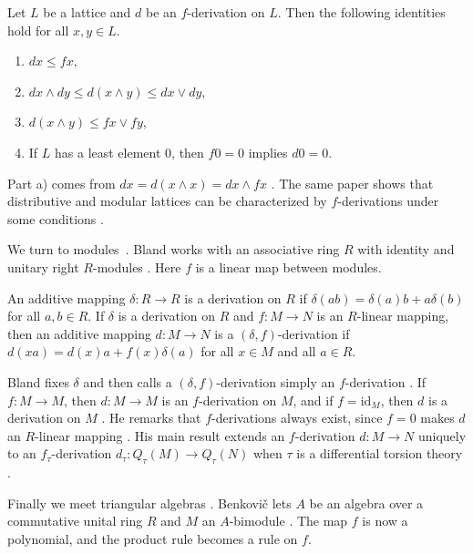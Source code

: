 \begin{proposition}\label{prop:f:lattice-first}
Let $L$ be a lattice and $d$ be an $f$-derivation on $L$. Then the following identities
hold for all $x,y\in L$.
\begin{enumerate}
\item[a)] $dx\le fx$,
\item[b)] $dx\wedge dy\le d(x\wedge y)\le dx\vee dy$,
\item[c)] $d(x\wedge y)\le fx\vee fy$,
\item[d)] If $L$ has a least element $0$, then $f0=0$ implies $d0=0$.
\end{enumerate}
\end{proposition}

Part a) comes from $dx=d(x\wedge x)=dx\wedge fx$
\cite[p.~703]{CevenOzturk2008}. The same paper shows that distributive and
modular lattices can be characterized by $f$-derivations under some conditions
\cite[p.~701]{CevenOzturk2008}.

We turn to modules~\cite[p.~379]{Bland2006}. Bland works with an associative ring $R$ with identity and
unitary right $R$-modules \cite[p.~379]{Bland2006}. Here $f$ is a linear map
between modules.

\begin{definition}\label{def:f:module}
An additive mapping $\delta:R\to R$ is a derivation on $R$ if
$\delta(ab)=\delta(a)b+a\delta(b)$ for all $a,b\in R$. If $\delta$ is a derivation on
$R$ and $f:M\to N$ is an $R$-linear mapping, then an additive mapping $d:M\to N$ is a
$(\delta,f)$-derivation if $d(xa)=d(x)a+f(x)\delta(a)$ for all $x\in M$ and all
$a\in R$.
\end{definition}

Bland fixes $\delta$ and then calls a $(\delta,f)$-derivation simply an
$f$-derivation \cite[p.~379]{Bland2006}. If $f:M\to M$, then $d:M\to M$ is an
$f$-derivation on $M$, and if $f=\mathrm{id}_M$, then $d$ is a derivation on
$M$ \cite[p.~379]{Bland2006}. He remarks that $f$-derivations always exist,
since $f=0$ makes $d$ an $R$-linear mapping \cite[p.~379]{Bland2006}. His main
result extends an $f$-derivation $d:M\to N$ uniquely to an $f_\tau$-derivation
$d_\tau:Q_\tau(M)\to Q_\tau(N)$ when $\tau$ is a differential torsion theory
\cite[p.~380]{Bland2006}.

Finally we meet triangular algebras \cite[Section~1]{Benkovic2014}. Benkovič
lets $A$ be an algebra over a commutative unital ring $R$ and $M$ an
$A$-bimodule \cite[Section~1]{Benkovic2014}. The map $f$ is now a polynomial,
and the product rule becomes a rule on $f$.

